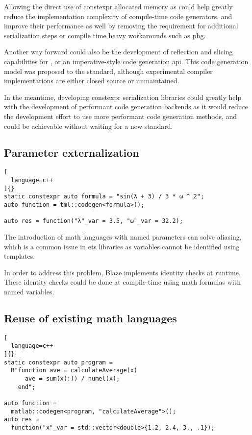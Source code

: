 \documentclass[main]{subfiles}
\begin{document}
Allowing the direct use of \gls{constexpr} allocated memory as 
could help greatly reduce the implementation complexity of compile-time code
generators, and improve their performance as well by removing the requirement
for additional serialization steps or compile time heavy workarounds such as
\gls{pbg}.

Another way forward could also be the development of reflection and slicing
capabilities for \cpp, or an imperative-style code generation \gls{api}.
This code generation model was proposed to the \cpp standard, although
experimental compiler implementations are either closed source or unmaintained.

In the meantime, developing \gls{constexpr} serialization libraries could
greatly help with the development of performant code generation backends
as it would reduce the development effort to use more performant code generation
methods, and could be achievable without waiting for a new \cpp standard.

\subsection*{Parameter externalization}

\begin{lstlisting}[
  language=c++
]{}
static constexpr auto formula = "sin(λ + 3) / 3 * ω ^ 2";
auto function = tml::codegen<formula>();

auto res = function("λ"_var = 3.5, "ω"_var = 32.2);
\end{lstlisting}

The introduction of math languages with named parameters can solve aliasing,
which is a common issue in \glspl{et} libraries as variables cannot be
identified using \cpp templates.

In order to address this problem, Blaze implements identity
checks at runtime. These identity checks could be done at compile-time
using math formulas with named variables.

\subsection*{Reuse of existing math languages}

\begin{lstlisting}[
  language=c++
]{}
static constexpr auto program =
  R"function ave = calculateAverage(x)
      ave = sum(x(:)) / numel(x);
    end";

auto function =
  matlab::codegen<program, "calculateAverage">();
auto res =
  function("x"_var = std::vector<double>{1.2, 2.4, 3., .1});
\end{lstlisting}
\end{document}
